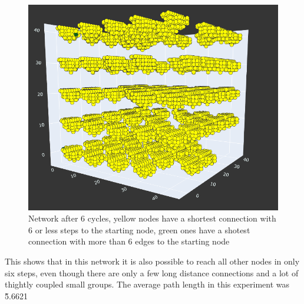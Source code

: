 \begin{figure}
    \centering
    \includegraphics[width=0.5\linewidth]{images/small_world_groups.png}
    \caption{Network after 6 cycles, yellow nodes have a shortest connection with 6 or less steps to the starting node,
    green ones have a shotest connection with more than 6 edges to the starting node}
    \label{fig:small_world_groups}
\end{figure}

This shows that in this network it is also possible to reach all other nodes in only six steps,
even though there are only a few long distance connections and a lot of thightly coupled
small groups. The average path length in this experiment was \~5.6621


